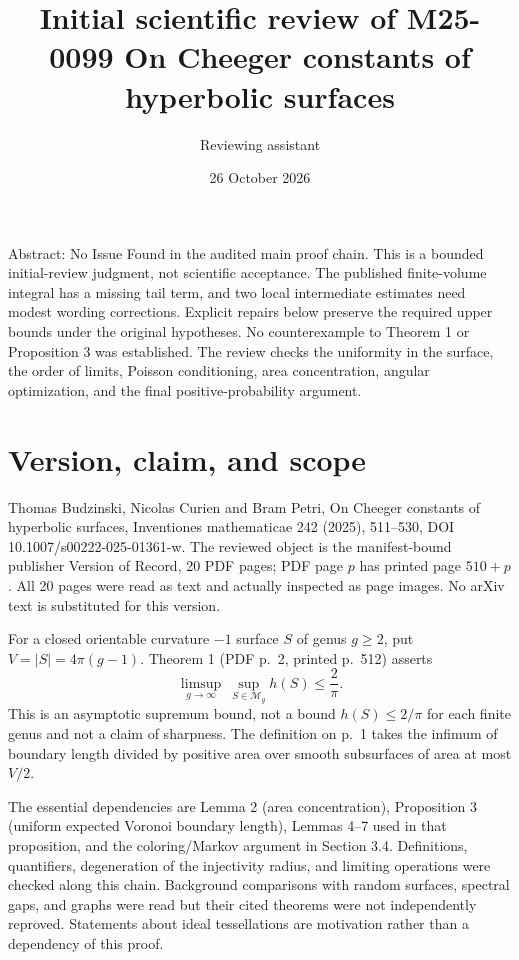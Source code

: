 \documentclass[10pt]{article}
\title{Initial scientific review of M25-0099
On Cheeger constants of hyperbolic surfaces}
\author{Reviewing assistant}
\date{26 October 2026}
\begin{document}
\maketitle
Abstract: No Issue Found in the audited main proof chain. This is a bounded initial-review judgment, not scientific acceptance. The published finite-volume integral has a missing tail term, and two local intermediate estimates need modest wording corrections. Explicit repairs below preserve the required upper bounds under the original hypotheses. No counterexample to Theorem 1 or Proposition 3 was established. The review checks the uniformity in the surface, the order of limits, Poisson conditioning, area concentration, angular optimization, and the final positive-probability argument.\par
\section*{Version, claim, and scope}
Thomas Budzinski, Nicolas Curien and Bram Petri, On Cheeger constants of hyperbolic surfaces, Inventiones mathematicae 242 (2025), 511–530, DOI 10.1007/s00222-025-01361-w. The reviewed object is the manifest-bound publisher Version of Record, 20 PDF pages; PDF page \(p\) has printed page \(510+p\). All 20 pages were read as text and actually inspected as page images. No arXiv text is substituted for this version.\par
For a closed orientable curvature \(-1\) surface \(S\) of genus \(g\geq2\), put \(V=|S|=4\pi(g-1)\). Theorem 1 (PDF p. 2, printed p. 512) asserts \[\limsup_{g\to\infty}\ \sup_{S\in\mathcal M_g}h(S)\leq \frac2\pi .\] This is an asymptotic supremum bound, not a bound \(h(S)\leq2/\pi\) for each finite genus and not a claim of sharpness. The definition on p. 1 takes the infimum of boundary length divided by positive area over smooth subsurfaces of area at most \(V/2\).\par
The essential dependencies are Lemma 2 (area concentration), Proposition 3 (uniform expected Voronoi boundary length), Lemmas 4–7 used in that proposition, and the coloring/Markov argument in Section 3.4. Definitions, quantifiers, degeneration of the injectivity radius, and limiting operations were checked along this chain. Background comparisons with random surfaces, spectral gaps, and graphs were read but their cited theorems were not independently reproved. Statements about ideal tessellations are motivation rather than a dependency of this proof.\par
\end{document}
